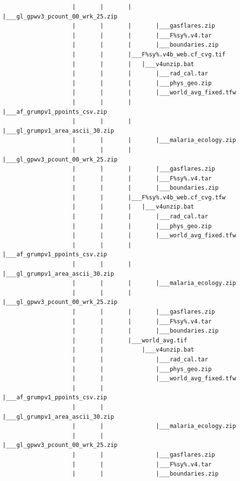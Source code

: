 \documentclass[
]{book}
\begin{document}
\begin{verbatim}
                    |       |       |       |___gl_gpwv3_pcount_00_wrk_25.zip
                    |       |       |       |___gasflares.zip
                    |       |       |       |___F%sy%.v4.tar
                    |       |       |       |___boundaries.zip
                    |       |       |___F%sy%.v4b_web.cf_cvg.tif
                    |       |       |   |___v4unzip.bat
                    |       |       |       |___rad_cal.tar
                    |       |       |       |___phys_geo.zip
                    |       |       |       |___world_avg_fixed.tfw
                    |       |       |       |___af_grumpv1_ppoints_csv.zip
                    |       |       |       |___gl_grumpv1_area_ascii_30.zip
                    |       |       |       |___malaria_ecology.zip
                    |       |       |       |___gl_gpwv3_pcount_00_wrk_25.zip
                    |       |       |       |___gasflares.zip
                    |       |       |       |___F%sy%.v4.tar
                    |       |       |       |___boundaries.zip
                    |       |       |___F%sy%.v4b_web.cf_cvg.tfw
                    |       |       |   |___v4unzip.bat
                    |       |       |       |___rad_cal.tar
                    |       |       |       |___phys_geo.zip
                    |       |       |       |___world_avg_fixed.tfw
                    |       |       |       |___af_grumpv1_ppoints_csv.zip
                    |       |       |       |___gl_grumpv1_area_ascii_30.zip
                    |       |       |       |___malaria_ecology.zip
                    |       |       |       |___gl_gpwv3_pcount_00_wrk_25.zip
                    |       |       |       |___gasflares.zip
                    |       |       |       |___F%sy%.v4.tar
                    |       |       |       |___boundaries.zip
                    |       |       |___world_avg.tif
                    |       |           |___v4unzip.bat
                    |       |               |___rad_cal.tar
                    |       |               |___phys_geo.zip
                    |       |               |___world_avg_fixed.tfw
                    |       |               |___af_grumpv1_ppoints_csv.zip
                    |       |               |___gl_grumpv1_area_ascii_30.zip
                    |       |               |___malaria_ecology.zip
                    |       |               |___gl_gpwv3_pcount_00_wrk_25.zip
                    |       |               |___gasflares.zip
                    |       |               |___F%sy%.v4.tar
                    |       |               |___boundaries.zip

\end{verbatim}
\end{document}
